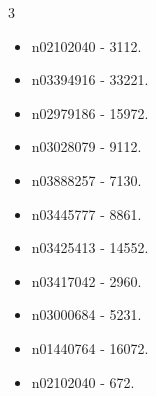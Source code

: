 \begin{multicols}{3}
\begin{itemize}
\item n02102040 - 3112.
\item n03394916 - 33221.
\item n02979186 - 15972.
\item n03028079 - 9112.
\item n03888257 - 7130.
\item n03445777 - 8861.
\item n03425413 - 14552.
\item n03417042 - 2960.
\item n03000684 - 5231.
\item n01440764 - 16072.
\item n02102040 - 672.
\end{itemize}
\end{multicols}

